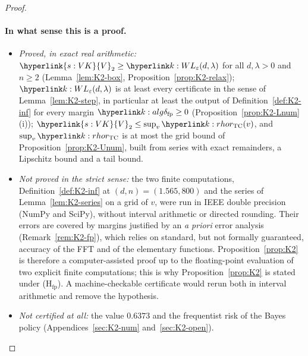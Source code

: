\documentclass[11pt]{article}
\DeclareRobustCommand{\sy}[2]{{\hyperlink{#1}{#2}}}
\newcommand{\1}{\mathbf{1}}
\newcommand{\VK}{\sy{s:VK}{V}}
\begin{document}
\begin{proof}
\paragraph{In what sense this is a proof.}
\begin{itemize}
\item \emph{Proved, in exact real arithmetic:} $\VK_2\ge\kL(d,\lambda)$ for all $d,\lambda>0$ and $n\ge2$ (Lemma~\ref{lem:K2-box}, Proposition~\ref{prop:K2-relax});
$\kL(d,\lambda)$ is at least every certificate in the sense of Lemma~\ref{lem:K2-step}, in particular at least the output of Definition~\ref{def:K2-inf} for every margin
$\kdfp\ge0$ (Proposition~\ref{prop:K2-Lnum}(i)); $\VK_2\le\sup_v\kr(v)$, and $\sup_v\kr$ is at most the grid bound of Proposition~\ref{prop:K2-Unum}, built from series
with exact remainders, a Lipschitz bound and a tail bound.
\item \emph{Not proved in the strict sense:} the two finite computations, Definition~\ref{def:K2-inf} at $(d,n)=(1.565,800)$ and the series of
Lemma~\ref{lem:K2-series} on a grid of $v$, were run in IEEE double precision (NumPy and SciPy), without interval arithmetic or directed rounding. Their errors are
covered by margins justified by an \emph{a priori} error analysis (Remark~\ref{rem:K2-fp}), which relies on standard, but not formally guaranteed, accuracy of the
FFT and of the elementary functions. Proposition~\ref{prop:K2} is therefore a computer-assisted proof up to the floating-point evaluation of two explicit finite
computations; this is why Proposition~\ref{prop:K2} is stated under (H$_{\mathrm{fp}}$). A machine-checkable certificate would rerun both in interval arithmetic
and remove the hypothesis.
\item \emph{Not certified at all:} the value $0.6373$ and the frequentist risk of the Bayes policy (Appendices~\ref{sec:K2-num} and~\ref{sec:K2-open}).
\end{itemize}


\end{proof}
\end{document}
